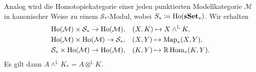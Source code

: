 \documentclass{cheat-sheet}
\newcommand{\ModC}{\mathcal{M}} %
\DeclareMathOperator{\Ho}{Ho} %
\newcommand{\LL}{\mathbb{L}} %
\newcommand{\RR}{\mathbb{R}} %
\newcommand{\Simpl}{\mathcal{S}} %
\begin{document}
\begin{satz}
  Analog wird die Homotopiekategorie einer jeden punktierten Modellkategorie $\ModC$ in kanonischer Weise zu einem $\Simpl_*$-Modul, wobei $S_* \coloneqq \Ho(\sSet_*)$.
  Wir erhalten
  \begin{align*}
    \Ho(\ModC) \times \Simpl_* \to \Ho(\ModC), \quad & (X, K) \mapsto X \wedge^{\LL} K, \\
    \Ho(\ModC) \times \Ho(\ModC) \to \Simpl_*, \quad & (X, Y) \mapsto \text{Map}_*(X, Y), \\
    \Simpl_* \times \Ho(\ModC) \to \Ho(\ModC), \quad & (K, Y) \mapsto \RR \Hom_*(K, Y).
  \end{align*}
  Es gilt dann $A \wedge^{\LL} K_* = A \otimes^{\LL} K$.
\end{satz}


\pagebreak

\end{document}

